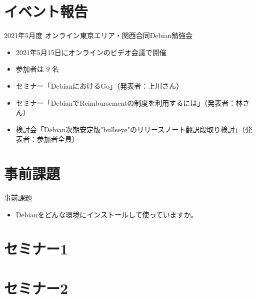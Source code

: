 \section{イベント報告}

\begin{frame}{2021年5月度 オンライン東京エリア・関西合同Debian勉強会}
\begin{itemize}
\item 2021年5月15日にオンラインのビデオ会議で開催
\item 参加者は 9 名
\item セミナー「DebianにおけるGo」（発表者：上川さん）
\item セミナー「DebianでReimbursementの制度を利用するには」（発表者：林さん）
\item 検討会「Debian次期安定版"bullseye"のリリースノート翻訳段取り検討」（発表者：参加者全員）
\end{itemize}
\end{frame}


\section{事前課題}


\begin{frame}{事前課題}
  \begin{itemize}
   \item Debianをどんな環境にインストールして使っていますか。
  \end{itemize}
\end{frame}

{\footnotesize
  
}

%

\section{セミナー1}

\section{セミナー2}

